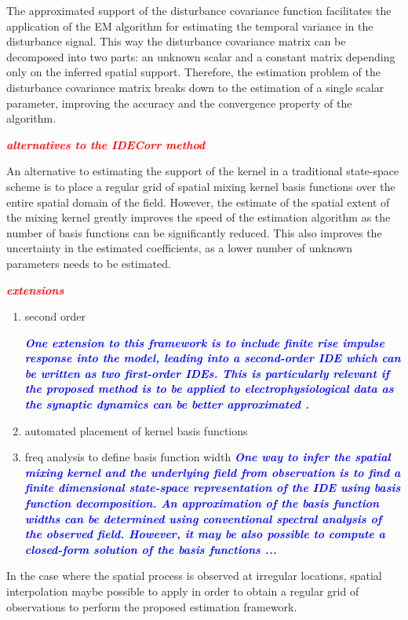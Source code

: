 \documentclass[10pt,twocolumn,twoside]{IEEEtran}
\newcommand{\dean}[1]{\textsf{\emph{\textbf{\textcolor{red}{#1}}}}}
\newcommand{\parham}[1]{\textsf{\emph{\textbf{\textcolor{blue}{#1}}}}}
\begin{document}
{The approximated support of the disturbance covariance function facilitates the application of the EM algorithm for estimating the temporal variance in the disturbance signal. This way the disturbance covariance matrix can be decomposed into two parts: an unknown scalar and a constant matrix depending only on the inferred spatial support. Therefore, the estimation problem of the disturbance covariance matrix breaks down to the estimation of a single scalar parameter, improving the accuracy and the convergence property of the algorithm.
                                                                                                                                                                     
\dean{alternatives to the IDECorr method}

An alternative to estimating the support of the kernel in a traditional state-space scheme is to place a regular grid of spatial mixing kernel basis functions over the entire spatial domain of the field. However, the estimate of the spatial extent of the mixing kernel greatly improves the speed of the estimation algorithm as the number of basis functions can be significantly reduced. This also improves the uncertainty in the estimated coefficients, as a lower number of unknown parameters needs to be estimated. 


\dean{extensions}

\begin{enumerate}
	\item second order 
 
\parham{ One extension to this framework is to include finite rise impulse response into the model, leading into a second-order IDE which can be written as two first-order IDEs. This is particularly relevant if the proposed method is to be applied to electrophysiological data as the synaptic dynamics can be better approximated \cite{VanRotterdam1982}.}   
	\item automated placement of kernel basis functions
	\item freq analysis to define basis function width  
	\parham{One way to infer the spatial mixing kernel and the underlying field from observation is to find a finite dimensional state-space representation of the IDE using basis function decomposition. An approximation of the basis function widths can be determined using conventional spectral analysis of the observed field. However, it may be also possible to compute a closed-form solution of the basis functions ...  }
\end{enumerate}
In the case where the spatial process is observed at irregular locations, spatial interpolation maybe possible to apply in order to obtain a regular grid of observations to perform the proposed estimation framework.




}
\end{document}
